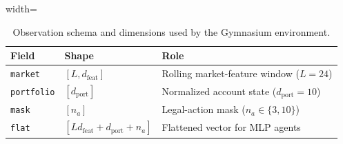 \begin{table}[!tbp]
\centering
\caption{Observation schema and dimensions used by the Gymnasium environment.}
\label{tab:obs_schema}

\begin{adjustbox}{width=\linewidth}
\begin{tabularx}{\linewidth}{@{}l l X@{}}
\toprule
\textbf{Field} & \textbf{Shape} & \textbf{Role} \\
\midrule
\texttt{market} & $[L, d_{\mathrm{feat}}]$ & Rolling market-feature window ($L=24$) \\
\texttt{portfolio} & $[d_{\mathrm{port}}]$ & Normalized account state ($d_{\mathrm{port}}=10$) \\
\texttt{mask} & $[n_a]$ & Legal-action mask ($n_a\in\{3,10\}$) \\
\texttt{flat} & $[L d_{\mathrm{feat}} + d_{\mathrm{port}} + n_a]$ & Flattened vector for MLP agents \\
\bottomrule
\end{tabularx}
\end{adjustbox}
\end{table}

